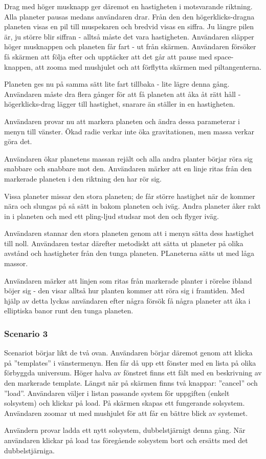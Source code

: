 Drag med höger musknapp ger däremot en hastigheten i motsvarande riktning.
Alla planeter pausas medans användaren drar.
Från den den högerklicks-dragna planeten visas en pil till muspekaren
och bredvid visas en siffra.
Ju längre pilen är, ju större blir siffran - alltså måste det vara hastigheten.
Användaren släpper höger musknappen och planeten får fart - ut från skärmen.
Användaren försöker få skärmen att följa efter och
upptäcker att det går att pause med space-knappen,
att zooma med mushjulet och att förflytta skärmen med piltangenterna.

Planeten ges nu på samma sätt lite fart tillbaka - lite lägre denna gång.
Användaren måste dra flera gånger för att få planeten att
åka åt rätt håll - högerklicks-drag lägger till hastighet,
snarare än ställer in en hastigheten.

Användaren provar nu att markera planeten och 
ändra dessa parameterar i menyn till vänster.
Ökad radie verkar inte öka gravitationen,
men massa verkar göra det.

Användaren ökar planetens massan rejält och alla andra planter börjar
röra sig snabbare och snabbare mot den.
Användaren märker att en linje ritas från den markerade planeten
i den riktning den har rör sig.

Vissa planeter missar den stora planeten; de får större hastighet när
de kommer nära och slungas på så sätt in bakom planeten och iväg.
Andra planeter åker rakt in i planeten och med ett pling-ljud
studsar mot den och flyger iväg.

Användaren stannar den stora planeten genom att i menyn
sätta dess hastighet till noll.
Användaren testar därefter metodiskt att sätta ut planeter på olika avstånd
och hastigheter från den tunga planeten.
PLaneterna sätts ut med låga massor.

Användaren märker att linjen som ritas från markerade planter i rörelse
ibland böjer sig - den visar alltså hur planten kommer att röra sig i framtiden.
Med hjälp av detta lyckas användaren efter några försök
få några planeter att åka i elliptiska banor runt den tunga planeten.


\subsubsection{Scenario 3}

Scenariot börjar likt de två ovan.
Användaren börjar däremot genom att klicka på ''templates'' i vänstermenyn.
Hen får då upp ett fönster med en lista på olika förbyggda universum.
Höger halva av fönstret finns ett fält med en beskrivning av den markerade
template.
Längst när på skärmen finns två knappar: ''cancel'' och ''load''.
Användaren väljer i listan passande system för uppgiften
(enkelt solsystem) och klickar på load.
På skärmen skapas ett fungerande solsystem.
Användaren zoomar ut med mushjulet för att får en bättre blick av systemet.

Användern provar ladda ett nytt solsystem, dubbelstjärnigt denna gång.
När användaren klickar på load tas föregående solsystem bort och
ersätts med det dubbelstjärniga.

